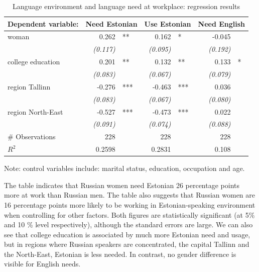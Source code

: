 \documentclass[12pt, a4paper]{article}
\newcommand{\std}[1]{\emph{(#1)}}
\begin{document}
\begin{table}[t]
	\centering
	\caption{Language environment and language need at workplace:
		regression results}
	\label{tab:environment_model}
	\begin{tabular}{l r@{}l r@{}l r@{}l}
		\toprule
		Dependent variable: & \multicolumn{2}{c}{Need Estonian} & \multicolumn{2}{c}{Use Estonian} & \multicolumn{2}{c}{Need English} \\ \midrule
		woman       & 0.262    & ** & 0.162    & *  & -0.045   &  \\
		         & \std{0.117} &   & \std{0.095} &   & \std{0.192} &  \\
		college education & 0.201    & ** & 0.132    & ** & 0.133    & * \\
		         & \std{0.083} &   & \std{0.067} &   & \std{0.079} &  \\
		region Tallinn  & -0.276   & *** & -0.463   & *** & 0.036    &  \\
		         & \std{0.083} &   & \std{0.067} &   & \std{0.080} &  \\
		region North-East & -0.527   & *** & -0.473   & *** & 0.022    &  \\
		         & \std{0.091} &   & \std{0.074} &   & \std{0.088} &  \\ \midrule
		\# Observations       & 228     &   & 228     &   & 228     &  \\
		$R^{2}$      & 0.2598   &   & 0.2831   &   & 0.108    &  \\ \bottomrule
	\end{tabular}
	\begin{flushleft}
		Note: control variables include: marital status, education,
		occupation and age.
	\end{flushleft}
\end{table}

The table indicates that Russian women need Estonian 26 percentage
points more at work than Russian men. The table also suggests that
Russian women are 16 percentage points more likely to be working in
Estonian-speaking environment when controlling for other factors.
Both figures are statistically significant (at 5\% and 10 \% level
respectively), although the standard errors are large. We can also see that
college education is associated by much more Estonian need and usage,
but in regions where Russian speakers are concentrated, the capital
Tallinn and the North-East, Estonian is less needed. In contrast, no
gender difference is visible for English needs.
\end{document}
